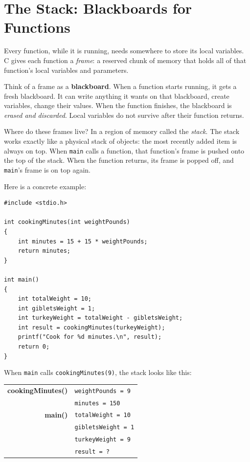 \section{The Stack: Blackboards for Functions}

Every function, while it is running, needs somewhere to store its
local variables.  C gives each function a \emph{frame}: a reserved
chunk of memory that holds all of that function's local variables and
parameters.

Think of a frame as a \textbf{blackboard}.  When a function starts
running, it gets a fresh blackboard.  It can write anything it wants
on that blackboard, create variables, change their values.  When the
function finishes, the blackboard is \emph{erased and discarded}.
Local variables do not survive after their function returns.

Where do these frames live?  In a region of memory called the
\emph{stack}.  The stack works exactly like a physical
stack of objects: the most recently added item is always on top.  When
\texttt{main} calls a function, that function's frame is pushed onto
the top of the stack.  When the function returns, its frame is popped
off, and \texttt{main}'s frame is on top again.

Here is a concrete example:

\begin{verbatim}
#include <stdio.h>

int cookingMinutes(int weightPounds)
{
    int minutes = 15 + 15 * weightPounds;
    return minutes;
}

int main()
{
    int totalWeight = 10;
    int gibletsWeight = 1;
    int turkeyWeight = totalWeight - gibletsWeight;
    int result = cookingMinutes(turkeyWeight);
    printf("Cook for %d minutes.\n", result);
    return 0;
}
\end{verbatim}

When \texttt{main} calls \texttt{cookingMinutes(9)}, the stack looks
like this:

\begin{center}
\begin{tabular}{r|l|}
\hline
\textbf{cookingMinutes()} & \texttt{weightPounds = 9} \\
                          & \texttt{minutes = 150} \\
\hline
\textbf{main()}           & \texttt{totalWeight = 10} \\
                          & \texttt{gibletsWeight = 1} \\
                          & \texttt{turkeyWeight = 9} \\
                          & \texttt{result = ?} \\
\hline
\end{tabular}
\end{center}

